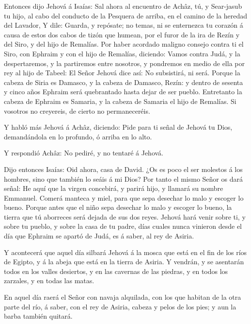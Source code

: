  Entonces dijo Jehová á Isaías: Sal ahora al encuentro de
Achâz, tú, y Sear-jasub tu hijo, al cabo del conducto de la Pesquera de
arriba, en el camino de la heredad del Lavador,  Y dile:
Guarda, y repósate; no temas, ni se enternezca tu corazón á causa de
estos dos cabos de tizón que humean, por el furor de la ira de Rezín y
del Siro, y del hijo de Remalías.  Por haber acordado
maligno consejo contra ti el Siro, con Ephraim y con el hijo de
Remalías, diciendo:  Vamos contra Judá, y la despertaremos,
y la partiremos entre nosotros, y pondremos en medio de ella por rey al
hijo de Tabeel:  El Señor Jehová dice así: No subsistirá, ni
será.  Porque la cabeza de Siria es Damasco, y la cabeza de
Damasco, Rezín: y dentro de sesenta y cinco años Ephraim será
quebrantado hasta dejar de ser pueblo.  Entretanto la cabeza
de Ephraim es Samaria, y la cabeza de Samaria el hijo de Remalías. Si
vosotros no creyereis, de cierto no permaneceréis.

 Y habló más Jehová á Achâz, diciendo:  Pide
para ti señal de Jehová tu Dios, demandándola en lo profundo, ó arriba
en lo alto.

 Y respondió Achâz: No pediré, y no tentaré á Jehová.

 Dijo entonces Isaías: Oid ahora, casa de David. ¿Os es
poco el ser molestos á los hombres, sino que también lo seáis á mi Dios?
 Por tanto el mismo Señor os dará señal: He aquí que la
virgen concebirá, y parirá hijo, y llamará su nombre Emmanuel.
 Comerá manteca y miel, para que sepa desechar lo malo y
escoger lo bueno.  Porque antes que el niño sepa desechar
lo malo y escoger lo bueno, la tierra que tú aborreces será dejada de
sus dos reyes.  Jehová hará venir sobre ti, y sobre tu
pueblo, y sobre la casa de tu padre, días cuales nunca vinieron desde el
día que Ephraim se apartó de Judá, es á saber, al rey de Asiria.

 Y acontecerá que aquel día silbará Jehová á la mosca que
está en el fin de los ríos de Egipto, y á la abeja que está en la tierra
de Asiria.  Y vendrán, y se asentarán todos en los valles
desiertos, y en las cavernas de las piedras, y en todos los zarzales, y
en todas las matas.

 En aquel día raerá el Señor con navaja alquilada, con los
que habitan de la otra parte del río, á saber, con el rey de Asiria,
cabeza y pelos de los pies; y aun la barba también quitará.

